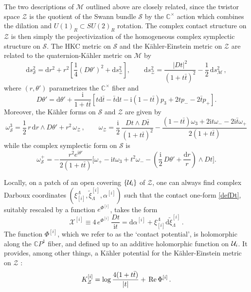 \documentclass[12pt,reqno]{article}
\numberwithin{equation}{section}
\newcommand{\be}{\begin{equation}}
\newcommand{\ee}{\end{equation}}
\def\Re{\,{\rm Re}\, }
\def\({\left(}
\def\){\right)}
\def\[{\left[}
\def\]{\right]}
\def\hf{\frac{1}{2}}
\def\hcU{{\cal U}}
\newcommand{\CP}{\IC P^1}
\newcommand{\de}{\mathrm{d}}
\newcommand{\I}{\mathrm{i}}
\newcommand{\cS}{\mathcal{S}}
\newcommand{\cM}{\mathcal{M}}
\newcommand{\cX}{\mathcal{X}}
\newcommand{\cZ}{\mathcal{Z}}
\newcommand{\IC}{\mathbb{C}}
\def\xii#1{\xi_{[#1]}}
\def\txii#1{{\tilde\xi}^{[#1]}}
\def\ai#1{{\alpha}^{[#1]}}
\def\ui#1{^{[#1]}}
\newcommand{\kahler}{{K\"ahler}\xspace}
\newcommand{\qk}{{quaternion-K\"ahler}\xspace}
\def\varpiqk{t}
\def\phip{{\theta'}}
\numberwithin{equation}{section}
\begin{document}
The two descriptions of $\cM$ outlined above are closely related, since the twistor space $\cZ$ is the quotient
of the Swann bundle $\cS$ by the $\IC^\times$ action which combines the dilation
and $U(1)_R\subset SU(2)_R$ rotation. The complex contact structure
on $\cZ$ is then simply the projectivization of the homogeneous  complex symplectic
structure on $\cS$. The HKC metric on $\cS$ and the \kahler-Einstein metric
on $\cZ$ are related to the \qk metric on $\cM$ by \cite{Alexandrov:2008nk}
\be
\de s^2_\cS=\de r^2+r^2\[\frac{1}{4}\(D \phip\)^2+ \de s^2_\cZ\] ,
\qquad
\de s^2_\cZ =
\frac{|D \varpiqk|^2}{(1+\varpiqk\bar\varpiqk)^2}-\hf\,\de s^2_\cM\, ,
\label{metricS}
\ee
where $(r,\phip)$ parametrizes the $\IC^\times$ fiber
and
\be
\label{defDphip}
D\phip = \de \phip+\frac{\I}{1+\varpiqk\bar\varpiqk}\[ \varpiqk\de\bar\varpiqk-\bar\varpiqk\de\varpiqk
-\I(1-\varpiqk\bar\varpiqk)p_3+2\varpiqk p_--2\bar\varpiqk p_+\].
\ee
Moreover, the \kahler forms on $\cS$ and $\cZ$ are given by
\be
\label{om3SZ}
\omega^3_{\cS} = \hf\,r\, \de r \wedge D\phip + r^2 \, \omega_{\cZ}\, ,
\qquad
\omega_{\cZ}=\frac{\I}{2}\,\frac{D \varpiqk \wedge D\bar\varpiqk}{(1+\varpiqk\bar\varpiqk)^2}
-\frac{(1-\varpiqk\bar\varpiqk)\omega_3+2\I\varpiqk \omega_- -2\I \bar\varpiqk \omega_+ }{2(1+\varpiqk\bar\varpiqk)}
\ee
while the complex symplectic form on $\cS$ is
\be
\omega^+_{\cS} = - \frac{r^2 e^{\I\phip}}{2(1+\varpiqk\bar\varpiqk)}\biggl[\omega_+-\I\varpiqk \omega_3+\varpiqk^2 \omega_-
-\(\frac{\I}{2}\,D\phip+\frac{\de r}{r}\)\wedge D\varpiqk \biggr].
\label{holom-om}
\ee


Locally, on a patch
of an open covering $\{\hcU_i\}$ of $\cZ$,
one can always find complex  Darboux coordinates  $(\xii{i}^\Lambda,\txii{i}_\Lambda,\ai{i})$
such that the contact one-form \eqref{defDt}, suitably rescaled by a function $e^{\Phi\ui{i}}$, takes the form
\be
\cX^{[i]}\equiv 4 \, e^{\Phi\ui{i}}\, \frac{D\varpiqk}{\I\varpiqk} =  \de\ai{i}+ \xi_{[i]}^\Lambda \de \tilde{\xi}^{[i]}_\Lambda\, .
\label{contform}
\ee
The function $\Phi\ui{i}$, which we refer to as the `contact potential', is holomorphic along
the $\CP$ fiber, and defined up to an additive holomorphic function on
$\hcU_i$.  It provides, among other things,
a K\"ahler potential for the \kahler-Einstein metric on $\cZ$ \cite{Alexandrov:2008nk}:
\be
\label{Knuflat}
K\ui{i}_{\cZ} = \log\frac{4(1+\varpiqk\bar \varpiqk)}{|\varpiqk|}+\Re\Phi\ui{i}\, .
\ee
\end{document}

